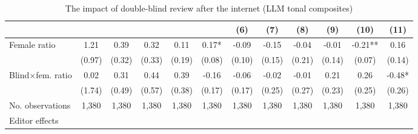 \begin{table}
    \footnotesize
    \centering
    \begin{threeparttable}
        \caption{The impact of double-blind review after the internet (LLM tonal composites)}
        \label{table7_semiblindllm}
        \begin{tabular}{p{4cm}S@{}S@{}S@{}S@{}S@{}S@{}S@{}S@{}S@{}S@{}S@{}}
            \toprule
            &{}&{}&{}&{}&{}&{(6)}&{(7)}&{(8)}&{(9)}&{(10)}&{(11)}\\
            \midrule
            Female ratio                  &        1.21   &        0.39   &        0.32   &        0.11   &        0.17*  &       -0.09   &       -0.15   &       -0.04   &       -0.01   &       -0.21** &        0.16   \\
                                          &      (0.97)   &      (0.32)   &      (0.33)   &      (0.19)   &      (0.08)   &      (0.10)   &      (0.15)   &      (0.21)   &      (0.14)   &      (0.07)   &      (0.14)   \\
            Blind\(\times\)fem. ratio     &        0.02   &        0.31   &        0.44   &        0.39   &       -0.16   &       -0.06   &       -0.02   &       -0.01   &        0.21   &        0.26   &       -0.48*  \\
                                          &      (1.74)   &      (0.49)   &      (0.57)   &      (0.38)   &      (0.17)   &      (0.17)   &      (0.25)   &      (0.27)   &      (0.23)   &      (0.25)   &      (0.26)   \\
            \midrule
            No. observations              &       1,380   &       1,380   &       1,380   &       1,380   &       1,380   &       1,380   &       1,380   &       1,380   &       1,380   &       1,380   &       1,380   \\
            \midrule
            Editor effects        &           {}   &           {}   &           {}   &           {}   &           {}   &           {}   &           {}   &           {}   &           {}   &           {}   &           {}   \\

\end{tabular}
\end{threeparttable}
\end{table}
